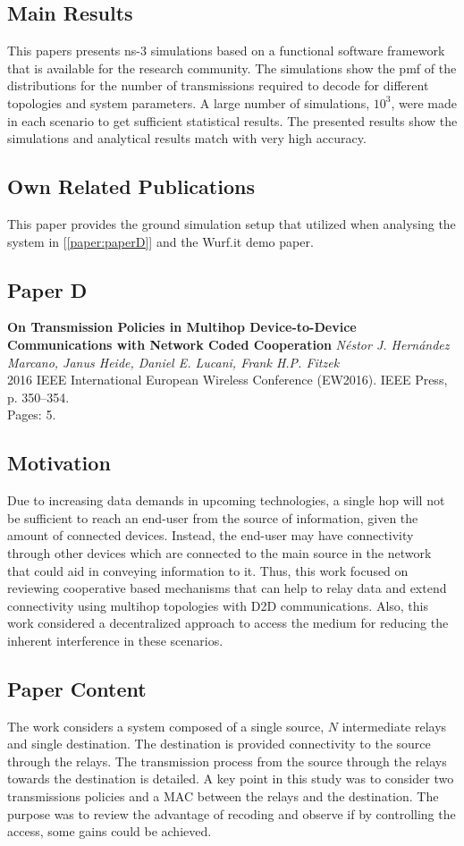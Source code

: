 \subsection*{Main Results}
This papers presents ns-3 simulations based on a functional software framework that is available for the research community. The simulations show the \ac{pmf} of the distributions for the number of transmissions required to decode for different topologies and system parameters. A large number of simulations, $10^3$, were made in each scenario to get sufficient statistical results. The presented results show the simulations and analytical results match with very high accuracy.

\subsection*{Own Related Publications}
This paper provides the ground simulation setup that utilized when analysing the system in [\ref{paper:paperD}] and the Wurf.it demo paper.

\clearpage


\subsection{Paper D}
\textbf{On Transmission Policies in Multihop Device-to-Device Communications
with Network Coded Cooperation}
\textit{N\'estor J. Hern\'andez Marcano, Janus Heide, Daniel E. Lucani, Frank H.P. Fitzek}
\\  2016 IEEE International European Wireless Conference (EW2016). IEEE Press, p. 350--354.
\\ Pages: 5.
\subsection*{Motivation}
Due to increasing data demands in upcoming technologies, a single hop will not be sufficient to reach an end-user from the source of information, given the amount of connected devices. Instead, the end-user may have connectivity through other devices which are connected to the main source in the network that could aid in conveying information to it. Thus, this work focused on reviewing cooperative based mechanisms that can help to relay data and extend connectivity using multihop topologies with \ac{D2D} communications. Also, this work considered a decentralized approach to access the medium for reducing the inherent interference in these scenarios.

 \subsection*{Paper Content}
The work considers a system composed of a single source, $N$ intermediate relays and single destination. The destination is provided connectivity to the source through the relays. The transmission process from the source through the relays towards the destination is detailed. A key point in this study was to consider two transmissions policies and a \ac{MAC} between the relays and the destination. The purpose was to review the advantage of recoding and observe if by controlling the access, some gains could be achieved.

